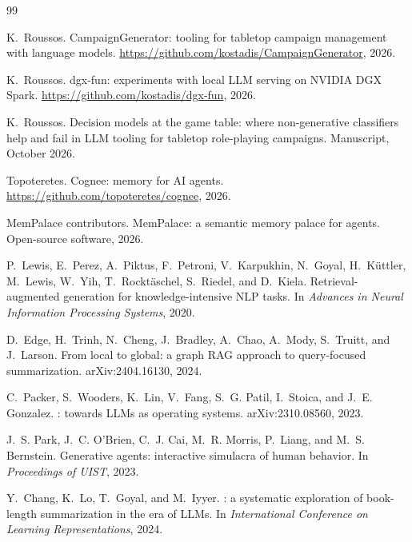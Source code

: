 \documentclass[11pt]{article}
\begin{document}

\begin{thebibliography}{99}

K.~Roussos.
\newblock CampaignGenerator: tooling for tabletop campaign management with language models.
\newblock \url{https://github.com/kostadis/CampaignGenerator}, 2026.

K.~Roussos.
\newblock dgx-fun: experiments with local LLM serving on NVIDIA DGX Spark.
\newblock \url{https://github.com/kostadis/dgx-fun}, 2026.

K.~Roussos.
\newblock Decision models at the game table: where non-generative classifiers help and fail in LLM
  tooling for tabletop role-playing campaigns.
\newblock Manuscript, October 2026.

Topoteretes.
\newblock Cognee: memory for AI agents.
\newblock \url{https://github.com/topoteretes/cognee}, 2026.

MemPalace contributors.
\newblock MemPalace: a semantic memory palace for agents.
\newblock Open-source software, 2026.

P.~Lewis, E.~Perez, A.~Piktus, F.~Petroni, V.~Karpukhin, N.~Goyal, H.~K{\"u}ttler, M.~Lewis,
  W.~Yih, T.~Rockt{\"a}schel, S.~Riedel, and D.~Kiela.
\newblock Retrieval-augmented generation for knowledge-intensive {NLP} tasks.
\newblock In \emph{Advances in Neural Information Processing Systems}, 2020.

D.~Edge, H.~Trinh, N.~Cheng, J.~Bradley, A.~Chao, A.~Mody, S.~Truitt, and J.~Larson.
\newblock From local to global: a graph {RAG} approach to query-focused summarization.
\newblock arXiv:2404.16130, 2024.

C.~Packer, S.~Wooders, K.~Lin, V.~Fang, S.~G. Patil, I.~Stoica, and J.~E. Gonzalez.
: towards {LLMs} as operating systems.
\newblock arXiv:2310.08560, 2023.

J.~S. Park, J.~C. O'Brien, C.~J. Cai, M.~R. Morris, P.~Liang, and M.~S. Bernstein.
\newblock Generative agents: interactive simulacra of human behavior.
\newblock In \emph{Proceedings of UIST}, 2023.

Y.~Chang, K.~Lo, T.~Goyal, and M.~Iyyer.
: a systematic exploration of book-length summarization in the era of {LLMs}.
\newblock In \emph{International Conference on Learning Representations}, 2024.


\end{thebibliography}
\end{document}
